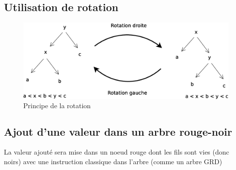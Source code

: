 \subsection{Utilisation de rotation}
\begin{figure}[H]
	\centering
	\includegraphics[width=12cm]{content/schemas/arbresRotation.eps}
	\caption{Principe de la rotation}
\end{figure}

\subsection{Ajout d'une valeur dans un arbre rouge-noir}
La valeur ajouté sera mise dans un noeud rouge dont les fils sont vies (donc noirs) avec une instruction classique dans l'arbre (comme un arbre GRD)

